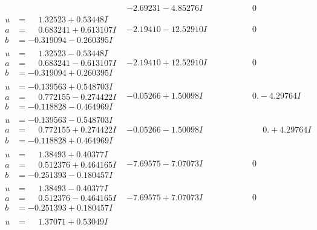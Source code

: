 \documentclass[1p]{elsarticle_modified}
\theoremstyle{definition}
\begin{document}
$$\begin{array}{c|c|c}
 & -2.69231 - 4.85276 I & \phantom{-0.000000 } 0 \\ \hline\begin{aligned}
u &= \phantom{-}1.32523 + 0.53448 I \\
a &= \phantom{-}0.683241 + 0.613107 I \\
b &= -0.319094 - 0.260395 I\end{aligned}
 & -2.19410 - 12.52910 I & \phantom{-0.000000 } 0 \\ \hline\begin{aligned}
u &= \phantom{-}1.32523 - 0.53448 I \\
a &= \phantom{-}0.683241 - 0.613107 I \\
b &= -0.319094 + 0.260395 I\end{aligned}
 & -2.19410 + 12.52910 I & \phantom{-0.000000 } 0 \\ \hline\begin{aligned}
u &= -0.139563 + 0.548703 I \\
a &= \phantom{-}0.772155 - 0.274422 I \\
b &= -0.118828 - 0.464969 I\end{aligned}
 & -0.05266 + 1.50098 I & \phantom{-0.000000 } 0. - 4.29764 I \\ \hline\begin{aligned}
u &= -0.139563 - 0.548703 I \\
a &= \phantom{-}0.772155 + 0.274422 I \\
b &= -0.118828 + 0.464969 I\end{aligned}
 & -0.05266 - 1.50098 I & \phantom{-0.000000 -}0. + 4.29764 I \\ \hline\begin{aligned}
u &= \phantom{-}1.38493 + 0.40377 I \\
a &= \phantom{-}0.512376 + 0.464165 I \\
b &= -0.251393 - 0.180457 I\end{aligned}
 & -7.69575 - 7.07073 I & \phantom{-0.000000 } 0 \\ \hline\begin{aligned}
u &= \phantom{-}1.38493 - 0.40377 I \\
a &= \phantom{-}0.512376 - 0.464165 I \\
b &= -0.251393 + 0.180457 I\end{aligned}
 & -7.69575 + 7.07073 I & \phantom{-0.000000 } 0 \\ \hline\begin{aligned}
u &= \phantom{-}1.37071 + 0.53049 I \\

\end{aligned}
\end{array}$$
\end{document}
